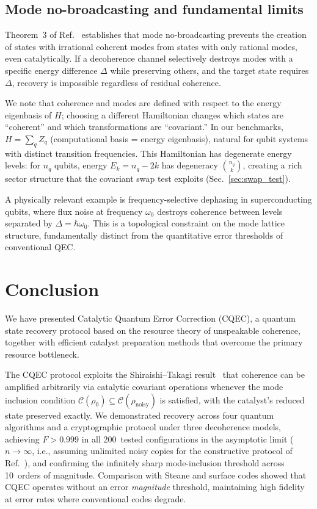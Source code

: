 \documentclass[prx,twocolumn,superscriptaddress,longbibliography,floatfix]{revtex4-2}
\begin{document}
\subsection{Mode no-broadcasting and fundamental limits}
\label{sec:no_broadcasting}

Theorem~3 of Ref.~\cite{Shiraishi2024} establishes that mode no-broadcasting prevents the creation of states with irrational coherent modes from states with only rational modes, even catalytically.
If a decoherence channel selectively destroys modes with a specific energy difference $\Delta$ while preserving others, and the target state requires $\Delta$, recovery is impossible regardless of residual coherence.

We note that coherence and modes are defined with respect to the energy eigenbasis of $H$; choosing a different Hamiltonian changes which states are ``coherent'' and which transformations are ``covariant.''
In our benchmarks, $H = \sum_q Z_q$ (computational basis = energy eigenbasis), natural for qubit systems with distinct transition frequencies.
This Hamiltonian has degenerate energy levels: for $n_q$ qubits, energy $E_k = n_q - 2k$ has degeneracy $\binom{n_q}{k}$, creating a rich sector structure that the covariant swap test exploits (Sec.~\ref{sec:swap_test}).

A physically relevant example is frequency-selective dephasing in superconducting qubits, where flux noise at frequency $\omega_0$ destroys coherence between levels separated by $\Delta = \hbar\omega_0$.
This is a topological constraint on the mode lattice structure, fundamentally distinct from the quantitative error thresholds of conventional QEC.


\section{Conclusion}
\label{sec:conclusion}

We have presented Catalytic Quantum Error Correction (CQEC), a quantum state recovery protocol based on the resource theory of unspeakable coherence, together with efficient catalyst preparation methods that overcome the primary resource bottleneck.

The CQEC protocol exploits the Shiraishi--Takagi result~\cite{Shiraishi2024} that coherence can be amplified arbitrarily via catalytic covariant operations whenever the mode inclusion condition $\mathcal{C}(\rho_0) \subseteq \mathcal{C}(\rho_\mathrm{noisy})$ is satisfied, with the catalyst's reduced state preserved exactly.
We demonstrated recovery across four quantum algorithms and a cryptographic protocol under three decoherence models, achieving $F > 0.999$ in all 200~tested configurations in the asymptotic limit ($n \to \infty$, i.e., assuming unlimited noisy copies for the constructive protocol of Ref.~\cite{Shiraishi2024}), and confirming the infinitely sharp mode-inclusion threshold across 10~orders of magnitude.
Comparison with Steane and surface codes showed that CQEC operates without an error \emph{magnitude} threshold, maintaining high fidelity at error rates where conventional codes degrade.
\end{document}

